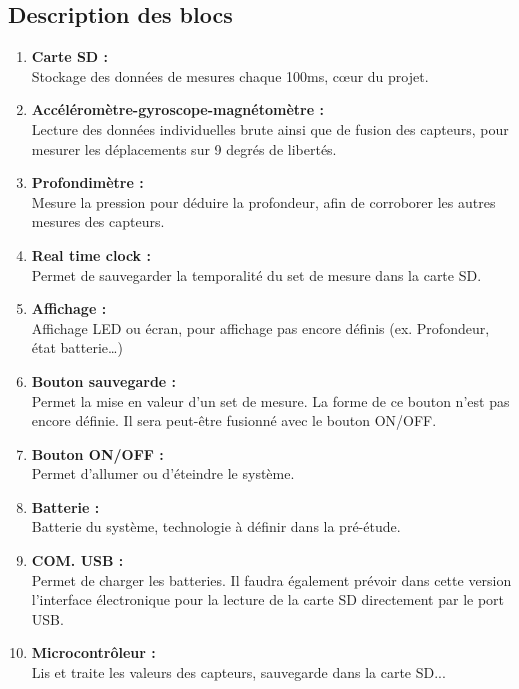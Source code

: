\subsection{Description des blocs}
\begin{enumerate}
    \item \textbf{Carte SD :}\\
    Stockage des données de mesures chaque 100ms, cœur du projet.
    \item \textbf{Accéléromètre-gyroscope-magnétomètre :}\\
    Lecture des données individuelles brute ainsi que de fusion des capteurs, pour mesurer les déplacements sur 9 degrés de libertés.
    \item \textbf{Profondimètre :}\\
    Mesure la pression pour déduire la profondeur, afin de corroborer les autres mesures des capteurs.
    \item \textbf{Real time clock :}\\
    Permet de sauvegarder la temporalité du set de mesure dans la carte SD.
    \item \textbf{Affichage :}\\
    Affichage LED ou écran, pour affichage pas encore définis (ex. Profondeur, état batterie…)
    \item \textbf{Bouton sauvegarde :}\\
    Permet la mise en valeur d’un set de mesure. La forme de ce bouton n’est pas encore définie. Il sera peut-être fusionné avec le bouton ON/OFF.
    \item \textbf{Bouton ON/OFF :}\\
    Permet d’allumer ou d’éteindre le système.
    \item \textbf{Batterie :}\\
    Batterie du système, technologie à définir dans la pré-étude. 
    \item \textbf{COM. USB :}\\
    Permet de charger les batteries. Il faudra également prévoir dans cette version l’interface électronique pour la lecture de la carte SD directement par le port USB.
    \item \textbf{Microcontrôleur :}\\
    Lis et traite les valeurs des capteurs, sauvegarde dans la carte SD...
\end{enumerate}


\clearpage


